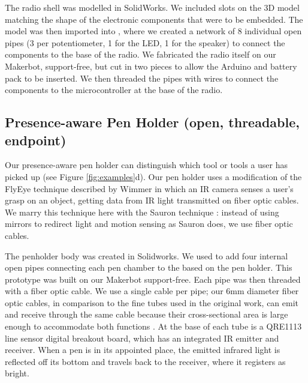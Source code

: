 The radio shell was modelled in SolidWorks. We included slots on the 3D model matching the shape of the electronic components that were to be embedded. The model was then imported into \systemnamenospace, where we created a network of 8 individual open pipes (3 per potentiometer, 1 for the LED, 1 for the speaker) to connect the components to the base of the radio. We fabricated the radio itself on our Makerbot, support-free, but cut in two pieces to allow the Arduino and battery pack to be inserted. We then threaded the pipes with wires to connect the components to the microcontroller at the base of the radio. 

\subsection{Presence-aware Pen Holder (open, threadable, endpoint)}
Our presence-aware pen holder can distinguish which tool or tools a user has picked up (see Figure \ref{fig:examples}d).  Our pen holder uses a modification of the FlyEye technique described by Wimmer \cite{Wimmer-flyeye} in which an IR camera senses a user's grasp on an object, getting data from IR light transmitted on fiber optic cables.  We marry this technique here with the Sauron technique \cite{Savage-sauron}: instead of using mirrors to redirect light and motion sensing as Sauron does, we use fiber optic cables. 

The penholder body was created in Solidworks. We used \systemname to add four internal open pipes connecting each pen chamber to the based on the pen holder. This prototype was built on our Makerbot support-free.  Each pipe was then threaded with a fiber optic cable.  We use a single cable per pipe; our 6mm diameter fiber optic cables, in comparison to the fine tubes used in the original work, can emit and receive through the same cable because their cross-sectional area is large enough to accommodate both functions . At the base of each tube is a QRE1113 line sensor digital breakout board, which has an integrated IR emitter and receiver.   When a pen is in its appointed place, the emitted infrared light is reflected off its bottom and travels back to the receiver, where it registers as bright.  

